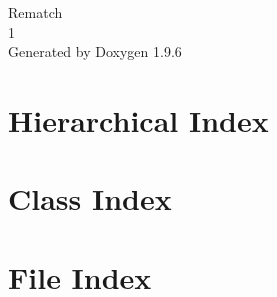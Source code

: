\documentclass[twoside]{book}
\newcommand{\+}{\discretionary{\mbox{\scriptsize$\hookleftarrow$}}{}{}}
\newcommand{\clearemptydoublepage}{%
    \newpage{\pagestyle{empty}\cleardoublepage}%
  }
\begin{document}
  \raggedbottom
    \hypersetup{pageanchor=false,
                bookmarksnumbered=true,
                pdfencoding=unicode
               }
  \begin{titlepage}
  \vspace*{7cm}
  \begin{center}%
  {\Large Rematch}\\
  [1ex]\large 1 \\
  \vspace*{1cm}
  {\large Generated by Doxygen 1.9.6}\\
  \end{center}
  \end{titlepage}
  \clearemptydoublepage
  \tableofcontents
  \clearemptydoublepage
  \hypersetup{pageanchor=true}
\chapter{Hierarchical Index}

\chapter{Class Index}

\chapter{File Index}

\end{document}
